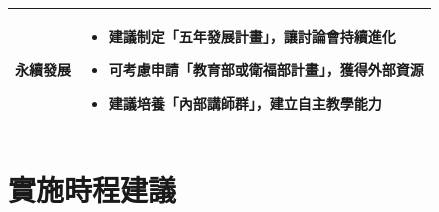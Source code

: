 \documentclass{article}
\begin{document}
\begin{longtable}{|>{\centering\arraybackslash}p{3cm}|>{\raggedright\arraybackslash}p{11cm}|}
\textbf{永續發展} & 
\begin{itemize}
    \item 建議制定「五年發展計畫」，讓討論會持續進化
    \item 可考慮申請「教育部或衛福部計畫」，獲得外部資源
    \item 建議培養「內部講師群」，建立自主教學能力
\end{itemize} \\
\hline

\end{longtable}

\vspace{1cm}

\section*{實施時程建議}
\end{document}
